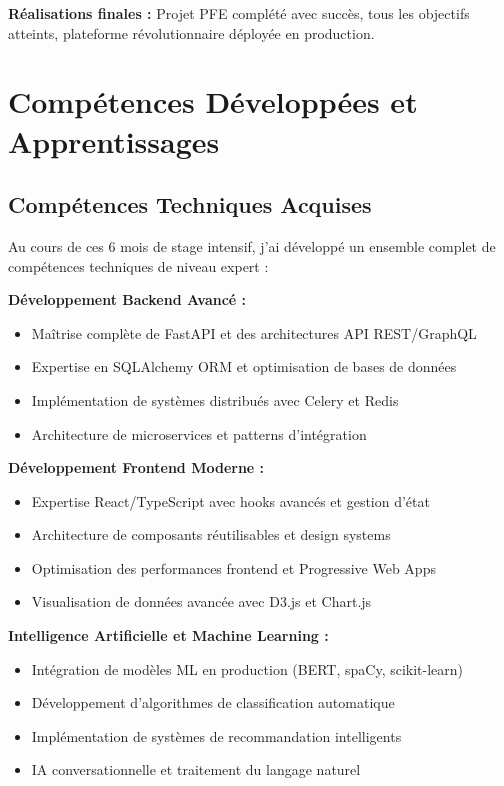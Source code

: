 \documentclass[a4paper,12pt]{article}
\begin{document}
\textbf{Réalisations finales :} Projet PFE complété avec succès, tous les objectifs atteints, plateforme révolutionnaire déployée en production.

\newpage

\section{Compétences Développées et Apprentissages}

\subsection{Compétences Techniques Acquises}

Au cours de ces 6 mois de stage intensif, j'ai développé un ensemble complet de compétences techniques de niveau expert :

\textbf{Développement Backend Avancé :}
\begin{itemize}
    \item Maîtrise complète de FastAPI et des architectures API REST/GraphQL
    \item Expertise en SQLAlchemy ORM et optimisation de bases de données
    \item Implémentation de systèmes distribués avec Celery et Redis
    \item Architecture de microservices et patterns d'intégration
\end{itemize}

\textbf{Développement Frontend Moderne :}
\begin{itemize}
    \item Expertise React/TypeScript avec hooks avancés et gestion d'état
    \item Architecture de composants réutilisables et design systems
    \item Optimisation des performances frontend et Progressive Web Apps
    \item Visualisation de données avancée avec D3.js et Chart.js
\end{itemize}

\textbf{Intelligence Artificielle et Machine Learning :}
\begin{itemize}
    \item Intégration de modèles ML en production (BERT, spaCy, scikit-learn)
    \item Développement d'algorithmes de classification automatique
    \item Implémentation de systèmes de recommandation intelligents
    \item IA conversationnelle et traitement du langage naturel
\end{itemize}
\end{document}
